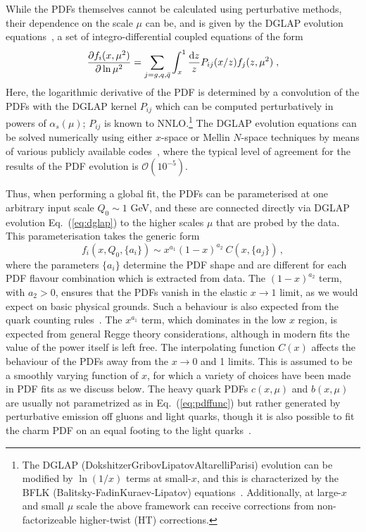 While the PDFs themselves cannot be calculated using perturbative methods, their dependence on the scale $\mu$ can be, and is given by the  
DGLAP evolution equations~\cite{Dokshitzer:1977sg,Gribov:1972ri,Altarelli:1977zs},
a set of integro-differential coupled equations of the form
\begin{equation}
  \label{eq:dglap}
\frac{\partial f_i(x,\mu^2)}{\partial \ln \mu^2}=\sum_{j=g,q,\bar{q}}\int_x^1 \frac{{\rm d}z}{z}P_{ij}(x/z)f_j(z,\mu^2)\;,
\end{equation}
Here, the logarithmic derivative of the PDF is determined by a convolution
of the PDFs with the DGLAP kernel $P_{ij}$ which can be computed
perturbatively in powers of $\alpha_{s}(\mu)$; $P_{ij}$ is known
to NNLO.\footnote{The DGLAP (Dokshitzer\textendash Gribov\textendash Lipatov\textendash Altarelli\textendash Parisi)
evolution can be modified by $\ln(1/x)$ terms at small-$x$, and
this is characterized by the BFLK (Balitsky-FadinKuraev-Lipatov) equations~\cite{Kuraev:1976ge,Kuraev:1977fs,Balitsky:1978ic}.
%
Additionally, at large-$x$ and small $\mu$ scale the above framework
can receive corrections from non-factorizeable higher-twist (HT) corrections.}
%
The DGLAP evolution equations can be solved numerically using
either $x$-space or Mellin $N$-space techniques by means of various
publicly available
codes~\cite{Bertone:2013vaa,Salam:2008qg,Botje:2010ay}, where the typical level of agreement
for the results of the PDF evolution is $\mathcal{O}(10^{-5})$.

Thus, when performing a global fit, the PDFs can be parameterised at one arbitrary input scale $Q_0\sim 1$ GeV, and these are connected directly via
DGLAP evolution
Eq.~(\ref{eq:dglap}) to the higher scales $\mu$ that are probed by the data.
This parameterisation takes the generic form
\begin{equation}\label{eq:pdffunc}
f_{i}(x,Q_0,\{a_i\})\sim x^{a_1}(1-x)^{a_2}\:C(x,\{a_j\})\, ,
\end{equation}
where the parameters $\{a_i\}$ determine the PDF shape
and are different for each PDF flavour combination which
is extracted from data.
%
The $(1-x)^{a_2}$ term, with $a_{2}>0$, ensures that the PDFs
vanish in the elastic $x\to 1$ limit, as we would expect on basic physical grounds. 
%
Such a behaviour is also expected from the quark
counting rules~\cite{Brodsky:1973kr,Ball:2016spl}.
%
The $x^{a_1}$ term, which dominates in the low $x$
region, is expected from general Regge theory considerations, although in modern fits the value of the power itself is left free.
%
The interpolating function $C(x)$ affects the behaviour of the PDFs away from the $x\to 0$ and 1 limits.
%
This is assumed to be a smoothly varying function of $x$, for which a variety of choices have been made in PDF fits as we discuss below.
%
The heavy quark PDFs $c(x,\mu)$ and $b(x,\mu)$ are usually not
parametrized as in  Eq.~(\ref{eq:pdffunc}) but rather
generated by perturbative emission off gluons and light quarks,
though it is also possible to fit the charm PDF on an equal footing
to the light quarks~\cite{Ball:2016neh}.

